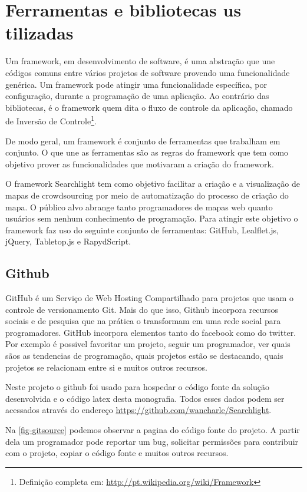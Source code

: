 \section{Ferramentas e bibliotecas us	tilizadas}

Um framework, em desenvolvimento de software, é uma abstração que une códigos comuns entre vários projetos de software provendo uma funcionalidade genérica. Um framework pode atingir uma funcionalidade específica, por configuração, durante a programação de uma aplicação. Ao contrário das bibliotecas, é o framework quem dita o fluxo de controle da aplicação, chamado de Inversão de Controle\footnote{Definição completa em: \url{http://pt.wikipedia.org/wiki/Framework}}.

De modo geral, um framework é conjunto de ferramentas que trabalham em conjunto. O que une as ferramentas são as regras do framework que tem como objetivo prover as funcionalidades que motivaram a criação do framework.

O framework Searchlight tem como objetivo facilitar a criação e a visualização de mapas de crowdsourcing por meio de automatização do processo de criação do mapa. O público alvo abrange tanto  programadores de mapas web quanto  usuários sem nenhum conhecimento de programação. Para atingir este objetivo o framework faz uso do seguinte conjunto de ferramentas: GitHub, Lealflet.js, jQuery, Tabletop.js e RapydScript. 

\subsection{Github}
GitHub é um Serviço de Web Hosting Compartilhado para projetos que usam o controle de versionamento Git. Mais do que isso, Github incorpora recursos sociais e de pesquisa que na prática o transformam em uma rede social para programadores. GitHub incorpora elementos tanto do facebook como do twitter. Por exemplo é possivel favoritar um projeto, seguir um programador, ver quais sãos as tendencias de programação, quais projetos estão se destacando, quais projetos se relacionam entre si e muitos outros recursos.

Neste projeto o github foi usado para hospedar o código fonte da solução desenvolvida e o código latex desta monografia. Todos esses dados podem ser acessados através do endereço \url{https://github.com/wancharle/Searchlight}. 

Na \autoref{fig-gitsource} podemos observar a pagina do código fonte do projeto. A partir dela um programador pode reportar um bug, solicitar permissões para contribuir com o projeto, copiar o código fonte e muitos outros recursos. 

